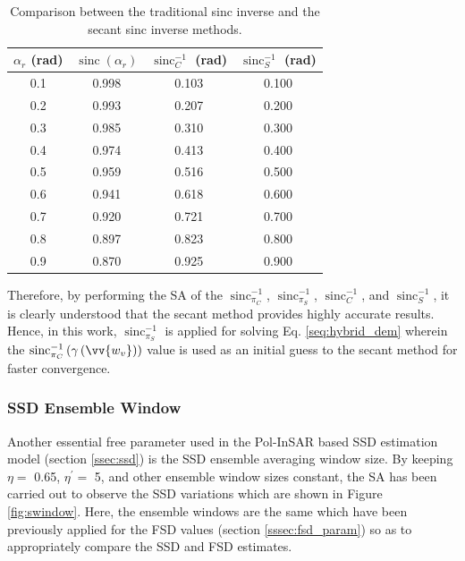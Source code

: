 \documentclass[review]{elsarticle}
\numberwithin{equation}{section}
\numberwithin{figure}{section}
\numberwithin{table}{section}
\DeclareMathOperator{\sinc}{sinc}
\begin{document}
\begin{table}[ht]
\centering
\caption{Comparison between the traditional \cite{Cloude2010} sinc inverse and the secant sinc inverse methods.}
\label{table:3}
\begin{tabular}{c c c c}
\hline
\boldmath$\alpha_r$ \textbf{(rad)} & \boldmath$\sinc\left(\alpha_r\right)$   & \boldmath$\sinc_C^{-1}$ \textbf{(rad)}     & \boldmath$\sinc_S^{-1}$ \textbf{(rad)} \\ \hline
0.1                 & 0.998            & 0.103          & 0.100  \\ 
0.2                 & 0.993            & 0.207          & 0.200  \\ 
0.3                 & 0.985            & 0.310          & 0.300  \\ 
0.4                 & 0.974            & 0.413          & 0.400  \\ 
0.5                 & 0.959            & 0.516          & 0.500   \\ 
0.6                 & 0.941            & 0.618          & 0.600  \\ 
0.7                 & 0.920            & 0.721          & 0.700   \\ 
0.8                 & 0.897            & 0.823          & 0.800 \\ 
0.9                 & 0.870            & 0.925          & 0.900 \\ \hline

\end{tabular}
\end{table}

Therefore, by performing the SA of the $\sinc_{\pi_C}^{-1}$, $\sinc_{\pi_S}^{-1}$, $\sinc_C^{-1}$, and $\sinc_S^{-1}$, it is clearly understood that the secant method provides highly accurate results. Hence, in this work, $\sinc_{\pi_S}^{-1}$ is applied for solving Eq. \eqref{seq:hybrid_dem} wherein the $\sinc_{\pi_C}^{-1}\left(\gamma\left(\vv{w_v}\right)\right)$ value is used as an initial guess to the secant method for faster convergence.

\subsubsection*{SSD Ensemble Window}

Another essential free parameter used in the Pol-InSAR based SSD estimation model (section \ref{ssec:ssd}) is the SSD ensemble averaging window size. By keeping $\eta = $ 0.65, $\eta^\prime = $ 5, and other ensemble window sizes constant, the SA has been carried out to observe the SSD variations which are shown in Figure \ref{fig:swindow}. Here, the ensemble windows are the same which have been previously applied for the FSD values (section \ref{sssec:fsd_param}) so as to appropriately compare the SSD and FSD estimates.
\end{document}
